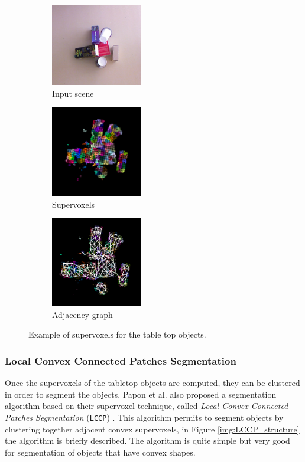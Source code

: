 \begin{figure}[tb]
\centering
\begin{subfigure}[t]{0.3\textwidth}
\centering
\includegraphics[width=4cm]{Img/ObjectSegmentation/seg1_rgb.png}
\caption{Input scene}
\end{subfigure}
\begin{subfigure}[t]{0.3\textwidth}
\centering
\includegraphics[width=4cm]{Img/ObjectSegmentation/voxel2.png}
\caption{Supervoxels}
\end{subfigure}
\begin{subfigure}[t]{0.3\textwidth}
\centering
\includegraphics[width=4cm]{Img/ObjectSegmentation/voxel1.png}
\caption{Adjacency graph}
\end{subfigure}
\caption{Example of supervoxels for the table top objects.}\label{fig:voxels_results}
\end{figure}

\subsubsection{Local Convex Connected Patches Segmentation}
\label{sec:LCCP}
Once the supervoxels of the tabletop objects are computed, they can be clustered in order to segment the objects. Papon et al. also proposed a segmentation algorithm based on their supervoxel technique, called \textit{Local Convex Connected Patches Segmentation} (\texttt{LCCP}) \citep{LCCP}. This algorithm permits to segment objects by clustering together adjacent convex supervoxels, in Figure \ref{img:LCCP_structure} the algorithm is briefly described.   The algorithm is quite simple but very good for segmentation of objects that have convex shapes. 

